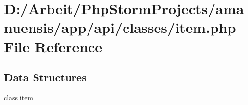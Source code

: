 \hypertarget{item_8php}{}\section{D\+:/\+Arbeit/\+Php\+Storm\+Projects/amanuensis/app/api/classes/item.php File Reference}
\label{item_8php}
\subsection*{Data Structures}
\begin{DoxyCompactItemize}
\item 
class \hyperlink{classitem}{item}
\end{DoxyCompactItemize}
